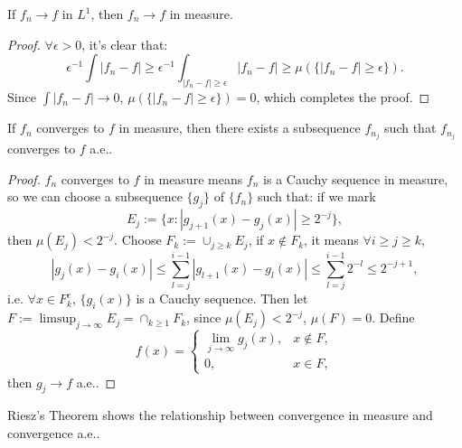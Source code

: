 \begin{prop}
    \label{Prop:L1convergeImplyConvergeinmeas}
    If $f_{n}\rightarrow f$ in $L^{1}$, then $f_{n}\rightarrow f$ 
    in measure.
\end{prop}
\begin{proof}
    $\forall\epsilon>0$, it's clear that:
    \begin{displaymath}
        \epsilon^{-1}\int|f_n-f|\ge\epsilon^{-1}
        \int_{|f_n-f|\ge\epsilon}|f_{n}-f|
        \ge\mu(\{|f_n-f|\ge\epsilon\}).
    \end{displaymath}
    Since $\int|f_{n}-f|\rightarrow 0$, 
    $\mu(\{|f_n-f|\ge\epsilon\})=0$, 
    which completes the proof.
\end{proof}
\begin{thm}[Riesz]
    \label{Thm:Riesz}
    If $f_{n}$ converges to $f$ in measure, then 
    there exists a subsequence $f_{n_j}$ such that $f_{n_j}$ 
    converges to $f$ a.e..
\end{thm}
\begin{proof}
    $f_{n}$ converges to $f$ in measure means $f_{n}$ is a Cauchy 
    sequence in measure, so 
    we can choose a subsequence $\{g_{j}\}$ 
    of $\{f_{n}\}$ such that: if we mark 
    \begin{displaymath}
        E_{j}:=\{x:|g_{j+1}(x)-g_{j}(x)|\ge 2^{-j}\},
    \end{displaymath}
    then $\mu(E_j)<2^{-j}$. 
    Choose $F_{k}:=\cup_{j\ge k}E_{j}$, if 
    $x\notin F_{k}$, it means 
    $\forall i\ge j\ge k$, 
    \begin{displaymath}
        |g_{j}(x)-g_{i}(x)|\le
        \sum_{l=j}^{i-1}|g_{l+1}(x)-g_{l}(x)|
        \le\sum_{l=j}^{i-1}2^{-l}\le2^{-j+1},
    \end{displaymath}
    i.e. $\forall x\in F_{k}^{c}$, 
    $\{g_{i}(x)\}$ is a Cauchy sequence. 
    Then let $F:=\limsup_{j\rightarrow\infty}E_{j}
    =\cap_{k\ge 1}F_{k}$, 
    since $\mu(E_j)<2^{-j}$, 
    $\mu(F)=0$. Define 
    \begin{displaymath}
        f(x)=\left\{
            \begin{array}{rl}
                \lim_{j\rightarrow\infty}g_{j}(x),&x\notin F,\\
                0,&x\in F,
            \end{array}
        \right.
    \end{displaymath}
    then $g_{j}\rightarrow f$ a.e..
\end{proof}
\begin{rem}
    Riesz's Theorem shows the relationship between 
    convergence in measure and convergence a.e..
\end{rem}
